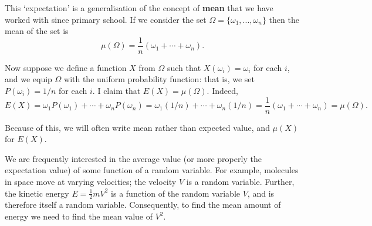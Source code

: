 \documentclass[a4paper,leqno]{article}
\numberwithin{equation}{section}
\theoremstyle{definition}
\theoremstyle{remark}
\newcommand{\df}{\textbf}
\begin{document}
This `expectation' is a generalisation of the concept of \df{mean} that we have worked with since primary school. If
we consider the set $ \Omega = \{\omega_1,...,\omega_n\} $ then the mean of the set is
\begin{displaymath}
  \mu(\Omega) = \frac{1}{n} (\omega_1 + \cdots + \omega_n).
\end{displaymath}

Now suppose we define a function $ X $ from $ \Omega $ such that $ X(\omega_i) = \omega_i $ for each $ i $, and we
equip $ \Omega $ with the uniform probability function: that is, we set $ P(\omega_i) = 1/n $ for each $ i $.
I claim that $ E(X) = \mu(\Omega) $. Indeed,
\begin{displaymath}
  E(X) = \omega_1 P(\omega_1) + \cdots + \omega_n P(\omega_n) = \omega_1 (1/n) + \cdots + \omega_n (1/n) = \frac{1}{n} (\omega_1 + \cdots + \omega_n) = \mu(\Omega).
\end{displaymath}

Because of this, we will often write mean rather than expected value, and $ \mu(X) $ for $ E(X) $.

We are frequently interested in the average value (or more properly the expectation value) of some function of a random variable. For example,
molecules in space move at varying velocities; the velocity $ V $ is a random variable. Further, the kinetic energy $ E = \frac{1}{2} mV^2 $ is
a function of the random variable $ V $, and is therefore itself a random variable. Consequently, to find the mean amount of energy we need to
find the mean value of $ V^2 $.
\end{document}
